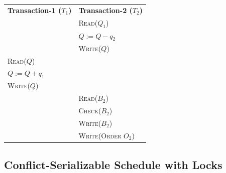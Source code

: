 \documentclass[12pt]{report}
\begin{document}
    \begin{center}
        \begin{adjustbox}{width=\textwidth}
            \begin{tabularx}{\textwidth}{|X|X|}
            \hline
            \multirow{2}{*}{\textbf{Transaction-1 ($T_{1}$)}} & \multirow{2}{*}{\textbf{Transaction-2 ($T_{2}$)}} \\
            & \\ \hline
            & \textsc{Read($Q_{1}$)} \\
            & \textsc{$Q := Q - q_{2}$} \\
            & \textsc{Write($Q$)} \\
            \textsc{Read($Q$)} & \\
            \textsc{$Q := Q + q_{1}$} & \\
            \textsc{Write($Q$)} & \\
            & \textsc{Read($B_{2}$)} \\
            & \textsc{Check($B_{2}$)} \\
            & \textsc{Write($B_{2}$)} \\
            & \textsc{Write(Order $O_{2}$)} \\
            \hline
            \end{tabularx}
        \end{adjustbox}
    \end{center}

    \pagebreak
    \subsection*{Conflict-Serializable Schedule with Locks}
\end{document}
